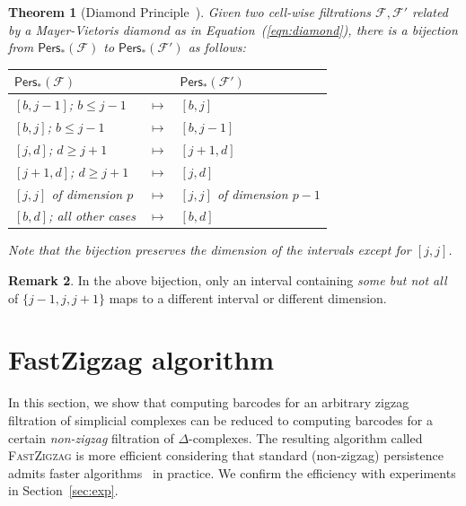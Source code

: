 \documentclass[letterpaper,11pt]{article}
\theoremstyle{mythmstyle}
\newtheorem{theorem}{Theorem}
\theoremstyle{mydefstyle}
\newtheorem{remark}{Remark}
\theoremstyle{plain}
\newtheorem{theorem}{Theorem}
\theoremstyle{definition}
\newtheorem{remark}[theorem]{Remark}
\newcommand{\Pers}{\mathsf{Pers}}
\newcommand{\<}[1]{\langle #1\rangle}
\newcommand{\Set}[1]{\{#1\}}
\newcommand{\Fcal}{\mathcal{F}}
\newcommand{\DG}{\Delta}
\newcommand{\Dim}{p}
\begin{document}
\begin{theorem}[Diamond Principle~\cite{carlsson2010zigzag}]
\label{thm:diamond}
Given two cell-wise filtrations $\Fcal,\Fcal'$ 
related by a Mayer-Vietoris diamond
as in Equation~(\ref{eqn:diamond}),
there is a bijection from $\Pers_*(\Fcal)$ to $\Pers_*(\Fcal')$
as follows{\rm:}

\begin{center}
\begin{tabular}{lll}
     \midrule
     $\Pers_*(\Fcal)$ & & $\Pers_*(\Fcal')$ \\
     \midrule
     $[b,j-1]${\rm;} $b\leq j-1$ & $\mapsto$ & $[b,j]$ \\
     $[b,j]${\rm;} $b\leq j-1$ & $\mapsto$ & $[b,j-1]$ \\
     $[j,d]${\rm;} $d\geq j+1$ & $\mapsto$ & $[j+1,d]$ \\
     $[j+1,d]${\rm;} $d\geq j+1$ & $\mapsto$ & $[j,d]$ \\
     $[j,j]$ {\rm of dimension $\Dim$}  & $\mapsto$ & $[j,j]$ {\rm of dimension $\Dim-1$} \\
     $[b,d]${\rm; all other cases} & $\mapsto$ & $[b,d]$ \\
     \midrule
\end{tabular}
\end{center}
Note that
the bijection preserves the dimension of the intervals
except for $[j,j]$.
\end{theorem}
\begin{remark}\label{rmk:diamond}
In the above bijection, only an interval containing {\it some but not all}
of $\Set{j-1,j,j+1}$ maps to a different interval
or different dimension.
\end{remark}


\section{{\sc FastZigzag} algorithm}
\label{sec:fzz}

In this section,
we show that computing 
barcodes for an arbitrary zigzag filtration of simplicial complexes
can be reduced to computing barcodes
for a certain {\it non-zigzag} filtration of $\DG$-complexes.
The resulting algorithm called \textsc{FastZigzag}
is more efficient
considering that standard (non-zigzag) persistence
admits faster algorithms~\cite{bauer2021ripser,bauer2014clear,bauer2017phat,BDM15,chen2011persistent,CK13,zhang2020gpu}
in practice. We confirm the efficiency with experiments in Section~\ref{sec:exp}.
\end{document}
